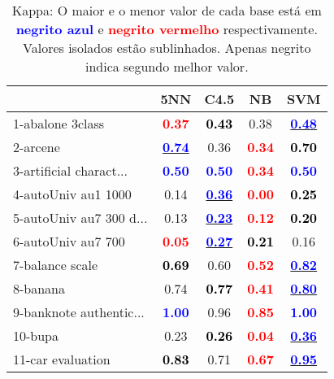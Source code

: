 \begin{table}
\caption{Kappa: O maior e o menor valor de cada base está em \textcolor{blue}{\textbf{negrito azul}} e \textcolor{red}{\textbf{negrito vermelho}} respectivamente. Valores isolados estão sublinhados. Apenas negrito indica segundo melhor valor.}
\begin{center}\begin{tabular}{lc|c|c|c}
 & 5NN & C4.5 & NB & SVM\\
 \hline 
1-abalone 3class & \textcolor{red}{\textbf{  0.37}} & \textcolor{black}{\textbf{  0.43}} &   0.38 & \underline{\textcolor{blue}{\textbf{  0.48}}} \\
2-arcene & \underline{\textcolor{blue}{\textbf{  0.74}}} &   0.36 & \textcolor{red}{\textbf{  0.34}} & \textcolor{black}{\textbf{  0.70}} \\
3-artificial charact... & \textcolor{blue}{\textbf{  0.50}} & \textcolor{blue}{\textbf{  0.50}} & \textcolor{red}{\textbf{  0.34}} & \textcolor{blue}{\textbf{  0.50}} \\
4-autoUniv au1 1000 &   0.14 & \underline{\textcolor{blue}{\textbf{  0.36}}} & \textcolor{red}{\textbf{  0.00}} & \textcolor{black}{\textbf{  0.25}} \\
5-autoUniv au7 300 d... &   0.13 & \underline{\textcolor{blue}{\textbf{  0.23}}} & \textcolor{red}{\textbf{  0.12}} & \textcolor{black}{\textbf{  0.20}} \\ \hline
6-autoUniv au7 700 & \textcolor{red}{\textbf{  0.05}} & \underline{\textcolor{blue}{\textbf{  0.27}}} & \textcolor{black}{\textbf{  0.21}} &   0.16 \\
7-balance scale & \textcolor{black}{\textbf{  0.69}} &   0.60 & \textcolor{red}{\textbf{  0.52}} & \underline{\textcolor{blue}{\textbf{  0.82}}} \\
8-banana &   0.74 & \textcolor{black}{\textbf{  0.77}} & \textcolor{red}{\textbf{  0.41}} & \underline{\textcolor{blue}{\textbf{  0.80}}} \\
9-banknote authentic... & \textcolor{blue}{\textbf{  1.00}} &   0.96 & \textcolor{red}{\textbf{  0.85}} & \textcolor{blue}{\textbf{  1.00}} \\
10-bupa &   0.23 & \textcolor{black}{\textbf{  0.26}} & \textcolor{red}{\textbf{  0.04}} & \underline{\textcolor{blue}{\textbf{  0.36}}} \\ \hline
11-car evaluation & \textcolor{black}{\textbf{  0.83}} &   0.71 & \textcolor{red}{\textbf{  0.67}} & \underline{\textcolor{blue}{\textbf{  0.95}}} \\

\end{tabular}
\end{center}
\end{table}
